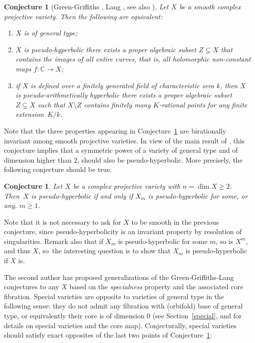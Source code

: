 \documentclass[JEP,XML,SOM,Unicode, NoEqCountersInSection,NoFloatCountersInSection,published]{cedram}
\theoremstyle{theorem}
\newtheorem{conjecture}[proposition]{Conjecture}
\theoremstyle{definition}
\begin{document}
\begin{conjecture}[Green-Griffiths \cite{GG80}, Lang \cite{lang87}, see also \cite{dem12a, Lang97}] \label{GGLconj}
Let \(X\) be a smooth complex projective variety. Then the following are equivalent:
\begin{enumerate}
\item \(X\) is of \emph{general type};
\item \(X\) is \emph{pseudo-hyperbolic} \ie there exists a proper algebraic subset \(Z \subsetneq X\) that contains the images of all \emph{entire curves}, that is, all holomorphic non-constant maps \(f : \mathbb{C} \to X\);
\item if \(X\) is defined over a finitely generated field of characteristic zero \(k\), then \(X\) is \emph{pseudo-arithmetically hyperbolic} \ie there exists a proper algebraic subset \(Z \subsetneq X\) such that \(X\setminus Z\) contains finitely many \(K\)-rational points for any finite extension~\(K/k\).
\end{enumerate}
\end{conjecture}

Note that the three properties appearing in Conjecture~\ref{GGLconj} are birationally invariant among smooth projective varieties. In view of the main result of \cite{AA02}, this conjecture implies that a symmetric power of a variety of general type and of dimension higher than \(2\), should also be pseudo-hyperbolic. More precisely, the following conjecture should be true.

\begin{conjecture}\label{symLang}
Let $X$ be a complex projective variety with $n=\dim X \geq 2$. Then~$X$ is pseudo-hyperbolic if and only if $X_m$ is pseudo-hyperbolic for some, or any, $m \geq 1$.
\end{conjecture}

Note that it is not necessary to ask for \(X\) to be smooth in the previous conjecture, since pseudo-hyperbolicity is an invariant property by resolution of singularities. \hbox{Remark} also that if $X_m$ is pseudo-hyperbolic for some $m$, so is $X^m$, and thus $X$, so~the interesting question is to show that $X_m$ is pseudo-hyperbolic if $X$ is.

The second author has proposed generalizations of the Green-Griffiths-Lang conjectures to any $X$ based on the \emph{specialness} property and the associated core fibration. Special varieties are opposite to varieties of general type in the following sense: they do not admit any fibration with (orbifold) base of general type, or equivalently their core is of dimension $0$ (see Section~\ref{special}, and \cite{Cam04} for details on special varieties and the core map). Conjecturally, special varieties should satisfy exact opposites of the last two points of Conjecture~\ref{GGLconj}:
\end{document}
